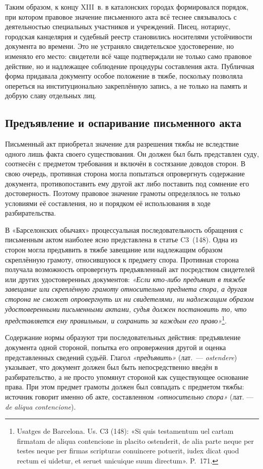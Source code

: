 Таким образом, к концу XIII~в. в каталонских городах формировался порядок, при котором правовое значение письменного акта всё теснее связывалось с деятельностью специальных участников и учреждений. Писец, нотариус, городская канцелярия и судебный реестр становились носителями устойчивости документа во времени. Это не устраняло свидетельское удостоверение, но изменяло его место: свидетели всё чаще подтверждали не только само правовое действие, но и надлежащее соблюдение процедуры составления акта. Публичная форма придавала документу особое положение в тяжбе, поскольку позволяла опереться на институционально закреплённую запись, а не только на память и добрую славу отдельных лиц.

\subsection{Предъявление и оспаривание письменного акта}

Письменный акт приобретал значение для разрешения тяжбы не вследствие одного лишь факта своего существования. Он должен был быть представлен суду, соотнесён с предметом требования и включён в состязание доводов сторон. В свою очередь, противная сторона могла попытаться опровергнуть содержание документа, противопоставить ему другой акт либо поставить под сомнение его достоверность. Поэтому правовое значение грамоты определялось не только условиями её составления, но и порядком её использования в ходе разбирательства.

В «Барселонских обычаях» процессуальная последовательность обращения с письменным актом наиболее ясно представлена в статье C3~(148). Одна из сторон могла предъявить в тяжбе завещание или надлежащим образом скреплённую грамоту, относившуюся к предмету спора. Противная сторона получала возможность опровергнуть предъявленный акт посредством свидетелей или других удостоверенных документов:\emph{ «Если кто-либо предъявит в тяжбе завещание или скреплённую грамоту относительно предмета спора, а другая сторона не сможет опровергнуть их ни свидетелями, ни надлежащим образом удостоверенными }\emph{письменными актами, судья должен постановить то, что представляется ему правильным, и сохранить за каждым его право»}\footnote{Usatges de Barcelona. Us. C3 (148): «Si quis testamentum uel cartam firmatam de aliqua contencione in placito ostenderit, de alia parte neque per testes neque per firmas scripturas conuincere potuerit, iudex dicat quod rectum ei uidetur, et seruet unicuique suum directum». P.~171.}.

Содержание нормы образуют три последовательных действия: предъявление документа одной стороной, попытка его опровержения другой и оценка представленных сведений судьёй. Глагол \emph{«предъявить»} (лат.~--- \emph{ostendere}) указывает, что документ должен был быть непосредственно введён в разбирательство, а не просто упомянут стороной как существующее основание права. При этом предмет грамоты должен был совпадать с предметом тяжбы: источник говорит именно об акте, составленном\emph{ «относительно спора»} (лат. --- \emph{de }\emph{aliqua}\emph{ }\emph{contencione}).

